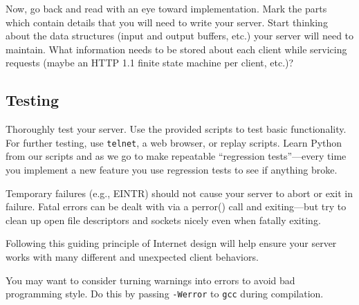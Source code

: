 	 Now, go back and read with an eye toward implementation. Mark the
      parts which contain details that you will need to write your server.
      Start thinking about the data structures (input and output buffers, etc.)
      your server will need to maintain. What information needs to be stored
      about each client while servicing requests (maybe an HTTP 1.1 finite state
      machine per client, etc.)?

\subsection{Testing}
	Thoroughly test your server. Use the provided scripts to test basic
	  functionality. For further testing, use \texttt{telnet}, a web browser,
	  or replay scripts. Learn Python from our scripts and as we go to make
	  repeatable ``regression tests''---every time you implement a new feature
	  you use regression tests to see if anything broke.

    \vspace{5pt}
    Temporary failures (e.g., EINTR) should not cause
      your server to abort or exit in failure.  Fatal errors can be dealt with
      via a perror() call and exiting---but try to clean up open file descriptors
      and sockets nicely even when fatally exiting.

    \vspace{5pt}
     Following this guiding principle of Internet design
      will help ensure your server works with many different and unexpected
      client behaviors.

    \vspace{5pt}
    
     You may want to consider turning warnings into errors to avoid bad
	  programming style. Do this by passing \texttt{-Werror} to \texttt{gcc}
	  during compilation.


